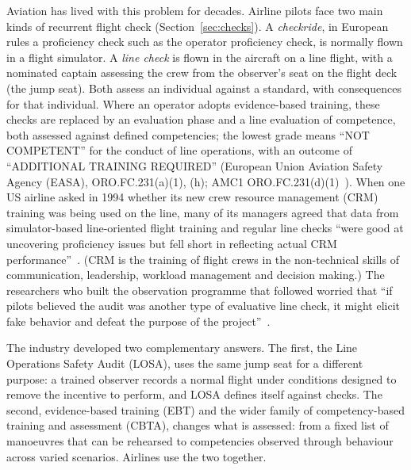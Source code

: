 \documentclass[11pt]{article}
\begin{document}
Aviation has lived with this problem for decades. Airline pilots face two main kinds of recurrent flight check (Section~\ref{sec:checks}). A \emph{checkride}, in European rules a proficiency check such as the operator proficiency check, is normally flown in a flight simulator. A \emph{line check} is flown in the aircraft on a line flight, with a nominated captain assessing the crew from the observer's seat on the flight deck (the jump seat). Both assess an individual against a standard, with consequences for that individual. Where an operator adopts evidence-based training, these checks are replaced by an evaluation phase and a line evaluation of competence, both assessed against defined competencies; the lowest grade means ``NOT COMPETENT'' for the conduct of line operations, with an outcome of ``ADDITIONAL TRAINING REQUIRED'' (European Union Aviation Safety Agency (EASA), ORO.FC.231(a)(1), (h); AMC1 ORO.FC.231(d)(1)~\cite{easa2026ear}). When one US airline asked in 1994 whether its new crew resource management (CRM) training was being used on the line, many of its managers agreed that data from simulator-based line-oriented flight training and regular line checks ``were good at uncovering proficiency issues but fell short in reflecting actual CRM performance''~\cite[``History of LOSA'']{klinect2003}. (CRM is the training of flight crews in the non-technical skills of communication, leadership, workload management and decision making.) The researchers who built the observation programme that followed worried that ``if pilots believed the audit was another type of evaluative line check, it might elicit fake behavior and defeat the purpose of the project''~\cite[``History of LOSA'']{klinect2003}.

The industry developed two complementary answers. The first, the Line Operations Safety Audit (LOSA), uses the same jump seat for a different purpose: a trained observer records a normal flight under conditions designed to remove the incentive to perform, and LOSA defines itself against checks. The second, evidence-based training (EBT) and the wider family of competency-based training and assessment (CBTA), changes what is assessed: from a fixed list of manoeuvres that can be rehearsed to competencies observed through behaviour across varied scenarios. Airlines use the two together.
\end{document}
